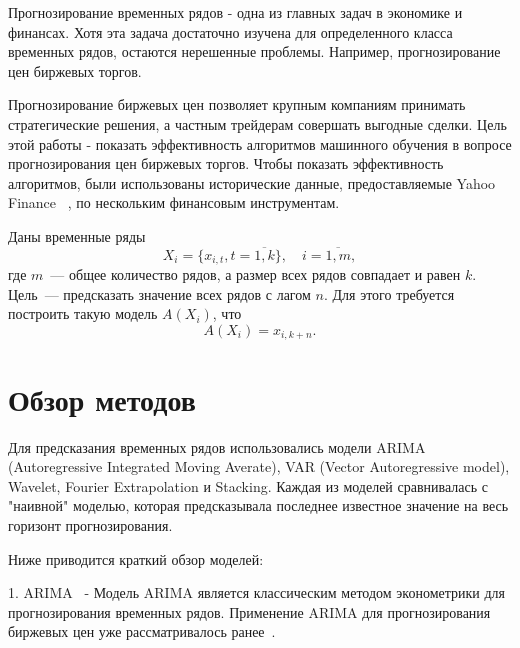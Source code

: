\documentclass[a4paper,article,14pt]{extarticle}
\begin{document}


\tableofcontents
\pagebreak


Прогнозирование временных рядов - одна из главных задач в экономике и финансах.
Хотя эта задача достаточно изучена для определенного класса временных рядов, остаются нерешенные проблемы.
Например, прогнозирование цен биржевых торгов.
\par
Прогнозирование биржевых цен позволяет крупным компаниям принимать стратегические решения, а частным трейдерам совершать выгодные сделки.
Цель этой работы - показать эффективность алгоритмов машинного обучения в вопросе прогнозирования цен биржевых торгов.
Чтобы показать эффективность алгоритмов, были использованы исторические данные, предоставляемые Yahoo Finance ~\cite{yahoo}, по нескольким финансовым инструментам.


Даны временные ряды
\begin{equation}
    {X_{i} = \{x_{i,t}, t=\overline{1,k}\},\quad i=\overline{1,m}},\label{eq:equation}
\end{equation}
где $m$~--- общее количество рядов, а размер всех рядов совпадает и равен $k$.
Цель~--- предсказать значение всех рядов с лагом $n$.
Для этого требуется построить такую модель $A(X_i)$, что
\begin{equation}
    A(X_i)=x_{i, k+n}.\label{eq:equation2}
\end{equation}


\section{Обзор методов}

Для предсказания временных рядов использовались модели ARIMA (Autoregressive Integrated Moving Averate), VAR (Vector Autoregressive model), Wavelet, Fourier Extrapolation и Stacking.
Каждая из моделей сравнивалась с "наивной" моделью, которая предсказывала последнее известное значение на весь горизонт прогнозирования.

\par
Ниже приводится краткий обзор моделей:

1.
ARIMA~\cite{arima} - Модель ARIMA является классическим методом эконометрики для прогнозирования временных рядов.
Применение ARIMA для прогнозирования биржевых цен уже рассматривалось ранее~\cite{my_arima_article}.
\end{document}
